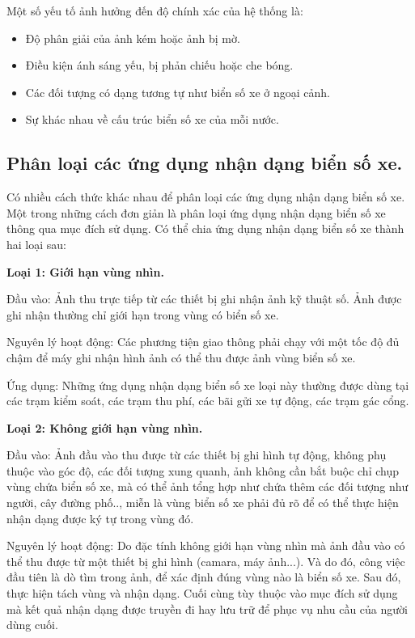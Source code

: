 	    Một số yếu tố ảnh hưởng đến độ chính xác của hệ thống là:
	    \begin{itemize}
	        \item Độ phân giải của ảnh kém hoặc ảnh bị mờ.
	        \item Điều kiện ánh sáng yếu, bị phản chiếu hoặc che bóng.
	        \item Các đối tượng có dạng tương tự như biển số xe ở ngoại cảnh.
	        \item Sự khác nhau về cấu trúc biển số xe của mỗi nước.
	    \end{itemize}
	    \subsection{Phân loại các ứng dụng nhận dạng biển số xe.}
	    Có nhiều cách thức khác nhau để phân loại các ứng dụng nhận dạng biển số xe. Một trong những cách đơn giản là phân loại ứng dụng nhận dạng biển số xe thông qua mục đích sử dụng. Có thể chia ứng dụng nhận dạng biển số xe thành hai loại sau:
	    
	    \textbf{Loại 1: Giới hạn vùng nhìn.}
	    
	    Đầu vào: Ảnh thu trực tiếp từ các thiết bị ghi nhận ảnh kỹ thuật số. Ảnh được ghi nhận thường chỉ giới hạn trong vùng có biển số xe.
	    
	    Nguyên lý hoạt động: Các phương tiện giao thông phải chạy với một tốc độ đủ chậm để máy ghi nhận hình ảnh có thể thu được ảnh vùng biển số xe.
	    
	    Ứng dụng: Những ứng dụng nhận dạng biển số xe loại này thường được dùng tại các trạm kiểm soát, các trạm thu phí, các bãi gửi xe tự động, các trạm gác cổng.
	    
	    \textbf{Loại 2: Không giới hạn vùng nhìn.}
	    
	    Đầu vào: Ảnh đầu vào thu được từ các thiết bị ghi hình tự động, không phụ thuộc vào góc độ, các đối tượng xung quanh, ảnh không cần bắt buộc chỉ chụp vùng chứa biển số xe, mà có thể ảnh tổng hợp như chứa thêm các đối tượng như người, cây đường phố.., miễn là vùng biển số xe phải đủ rõ để có thể thực hiện nhận dạng được ký tự trong vùng đó.
	    
	    Nguyên lý hoạt động: Do đặc tính không giới hạn vùng nhìn mà ảnh đầu vào có thể thu được từ một thiết bị ghi hình (camara, máy ảnh...). Và do đó, công việc đầu tiên là dò tìm trong ảnh, để xác định đúng vùng nào là biển số xe. Sau đó, thực hiện tách vùng và nhận dạng. Cuối cùng tùy thuộc vào mục đích sử dụng mà kết quả nhận dạng được truyền đi hay lưu trữ để phục vụ nhu cầu của người dùng cuối.
	    
